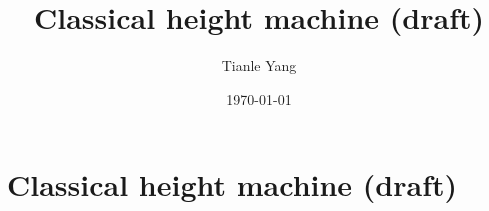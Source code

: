 \documentclass{noteformyself}
\title{Classical height machine (draft)}
\author{Tianle Yang}
\date{\today}
\begin{document}
    \maketitle

    \section{Classical height machine (draft)}



\end{document}
